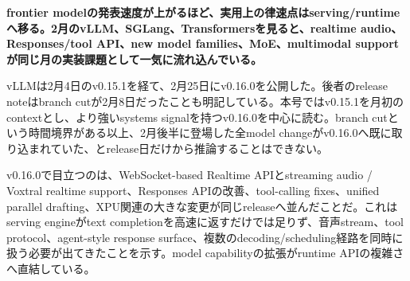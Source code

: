 \noindent\textbf{frontier modelの発表速度が上がるほど、実用上の律速点はserving/runtimeへ移る。2月のvLLM、SGLang、Transformersを見ると、realtime audio、Responses/tool API、new model families、MoE、multimodal supportが同じ月の実装課題として一気に流れ込んでいる。}\autocite{src-5041feb6f87f,src-5bc0746a47c6,src-a43d64987293}

vLLMは2月4日のv0.15.1を経て、2月25日にv0.16.0を公開した。後者のrelease noteはbranch cutが2月8日だったことも明記している。本号ではv0.15.1を月初のcontextとし、より強いsystems signalを持つv0.16.0を中心に読む。branch cutという時間境界がある以上、2月後半に登場した全model changeがv0.16.0へ既に取り込まれていた、とrelease日だけから推論することはできない。\autocite{src-5041feb6f87f,src-67307025f5d9}


v0.16.0で目立つのは、WebSocket-based Realtime APIとstreaming audio / Voxtral realtime support、Responses APIの改善、tool-calling fixes、unified parallel drafting、XPU関連の大きな変更が同じreleaseへ並んだことだ。これはserving engineがtext completionを高速に返すだけでは足りず、音声stream、tool protocol、agent-style response surface、複数のdecoding/scheduling経路を同時に扱う必要が出てきたことを示す。model capabilityの拡張がruntime APIの複雑さへ直結している。\autocite{src-5041feb6f87f}



